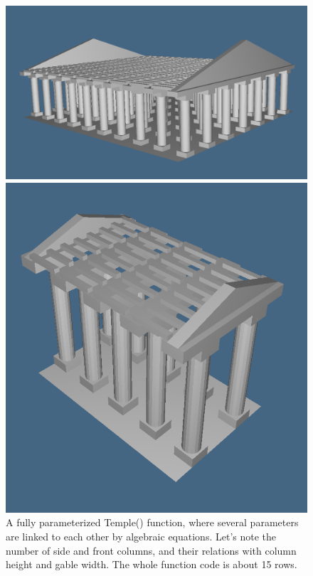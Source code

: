 \begin{figure}
\begin{minipage}[t]{0.571\linewidth}
		\vspace{-1mm}
	\includegraphics[width=\linewidth]{chapter-05/figs/temple-02}
\end{minipage}%
\begin{minipage}[t]{0.429\linewidth}
	\includegraphics[width=\linewidth]{chapter-05/figs/temple-03}
\caption{A fully parameterized {\sf Temple()} function, where several parameters are linked to each other by algebraic equations. Let’s note the number of side and front columns, and their relations with column height and gable width. The whole function code is about 15 rows.}
\end{minipage}
\end{figure}




